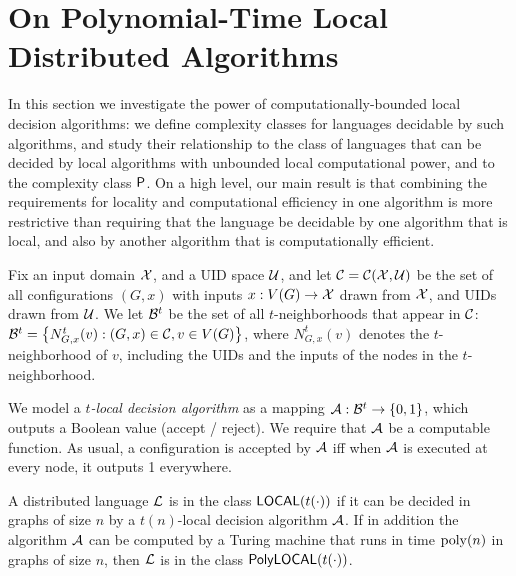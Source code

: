 \section{On Polynomial-Time Local Distributed Algorithms}
\label{sec:local}
In this section we investigate the power of computationally-bounded local decision algorithms:
we define complexity classes for languages decidable by 
such algorithms, and study their relationship to the class of languages
that can be decided by local algorithms with unbounded local computational power,
and to the complexity class ${\mathsf{P}}$.
On a high level, our main result is that combining the requirements for locality and computational efficiency
in one algorithm is more restrictive than requiring that the language
be decidable by one algorithm that is local,
and also by another algorithm that is computationally efficient.


Fix an input domain $\mathcal{X}$, and a UID space $\mathcal{U}$,
and let $\mathcal{C} = \mathcal{C}(\mathcal{X}, \mathcal{U})$ be the set of all configurations
$(G, x)$
with inputs $x : V(G) \rightarrow \mathcal{X}$ drawn from $\mathcal{X}$,
and UIDs drawn from $\mathcal{U}$.
We let $\mathcal{B}^t$ be the set of all $t$-neighborhoods that appear in $\mathcal{C}$:
	$\mathcal{B}^t = \left \{{ N_{G,x}^t(v) : (G,x) \in \mathcal{C}, v \in V(G) } \right \}$,
where $N_{G,x}^t(v)$ denotes the $t$-neighborhood of $v$,
including the UIDs and the inputs of the nodes in the $t$-neighborhood.

We model a \emph{$t$-local decision algorithm} as a mapping ${\mathcal{A}} : \mathcal{B}^t \rightarrow \left \{{0,1} \right \}$,
which outputs a Boolean value (accept / reject).
We require that ${\mathcal{A}}$ be a computable function.
As usual, a configuration is accepted by ${\mathcal{A}}$ iff when ${\mathcal{A}}$ is executed at every node,
it outputs 1 everywhere.

\begin{definition}
	A distributed language $\mathcal{L}$ is in the class ${\mathsf{LOCAL}}(t(\cdot))$ 
	if it can be decided in graphs of size $n$ by a $t(n)$-local decision algorithm ${\mathcal{A}}$.
	If in addition the algorithm ${\mathcal{A}}$ can be computed by a Turing machine
	that runs in time $\operatorname{poly}(n)$ in graphs of size $n$,
	then $\mathcal{L}$ is in the class ${\mathsf{PolyLOCAL}}(t(\cdot))$.
\end{definition}

